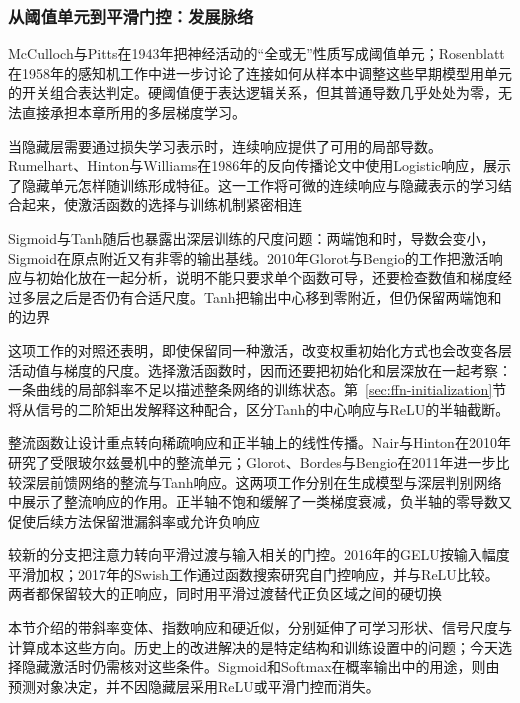 \subsubsection{从阈值单元到平滑门控：发展脉络}
\label{sec:ffn-activation-history}

McCulloch与Pitts在1943年把神经活动的“全或无”性质写成阈值单元；Rosenblatt在1958年的感知机工作中进一步讨论了连接如何从样本中调整这些早期模型用单元的开关组合表达判定。硬阈值便于表达逻辑关系，但其普通导数几乎处处为零，无法直接承担本章所用的多层梯度学习。

当隐藏层需要通过损失学习表示时，连续响应提供了可用的局部导数。Rumelhart、Hinton与Williams在1986年的反向传播论文中使用Logistic响应，展示了隐藏单元怎样随训练形成特征。这一工作将可微的连续响应与隐藏表示的学习结合起来，使激活函数的选择与训练机制紧密相连

Sigmoid与Tanh随后也暴露出深层训练的尺度问题：两端饱和时，导数会变小，Sigmoid在原点附近又有非零的输出基线。2010年Glorot与Bengio的工作把激活响应与初始化放在一起分析，说明不能只要求单个函数可导，还要检查数值和梯度经过多层之后是否仍有合适尺度。Tanh把输出中心移到零附近，但仍保留两端饱和的边界

这项工作的对照还表明，即使保留同一种激活，改变权重初始化方式也会改变各层活动值与梯度的尺度。选择激活函数时，因而还要把初始化和层深放在一起考察：一条曲线的局部斜率不足以描述整条网络的训练状态。第~\ref{sec:ffn-initialization}节将从信号的二阶矩出发解释这种配合，区分Tanh的中心响应与ReLU的半轴截断。

整流函数让设计重点转向稀疏响应和正半轴上的线性传播。Nair与Hinton在2010年研究了受限玻尔兹曼机中的整流单元；Glorot、Bordes与Bengio在2011年进一步比较深层前馈网络的整流与Tanh响应。这两项工作分别在生成模型与深层判别网络中展示了整流响应的作用。正半轴不饱和缓解了一类梯度衰减，负半轴的零导数又促使后续方法保留泄漏斜率或允许负响应

较新的分支把注意力转向平滑过渡与输入相关的门控。2016年的GELU按输入幅度平滑加权；2017年的Swish工作通过函数搜索研究自门控响应，并与ReLU比较。两者都保留较大的正响应，同时用平滑过渡替代正负区域之间的硬切换

本节介绍的带斜率变体、指数响应和硬近似，分别延伸了可学习形状、信号尺度与计算成本这些方向。历史上的改进解决的是特定结构和训练设置中的问题；今天选择隐藏激活时仍需核对这些条件。Sigmoid和Softmax在概率输出中的用途，则由预测对象决定，并不因隐藏层采用ReLU或平滑门控而消失。

